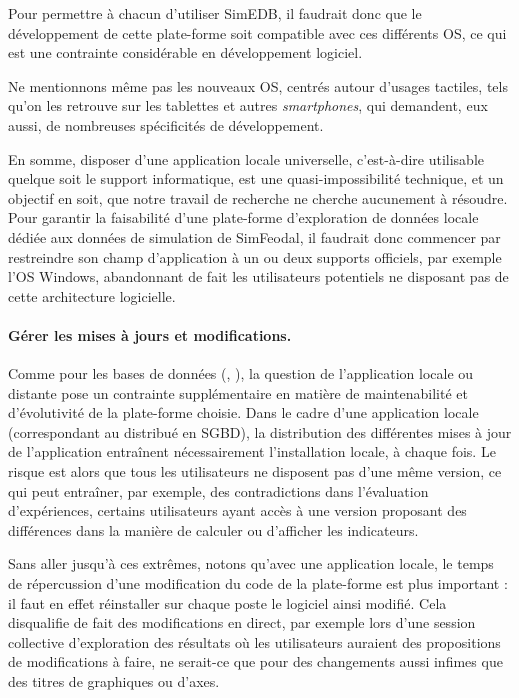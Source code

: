 Pour permettre à chacun d'utiliser SimEDB, il faudrait donc que le développement de cette plate-forme soit compatible avec ces différents OS, ce qui est une contrainte considérable en développement logiciel.

Ne mentionnons même pas les nouveaux OS, centrés autour d'usages tactiles, tels qu'on les retrouve sur les tablettes et autres \textit{smartphones}, qui demandent, eux aussi, de nombreuses spécificités de développement.

En somme, disposer d'une application locale universelle, c'est-à-dire utilisable quelque soit le support informatique, est une quasi-impossibilité technique, et un objectif en soit, que notre travail de recherche ne cherche aucunement à résoudre.
Pour garantir la faisabilité d'une plate-forme d'exploration de données locale dédiée aux données de simulation de SimFeodal, il faudrait donc commencer par restreindre son champ d'application à un ou deux supports officiels, par exemple l'OS Windows, abandonnant de fait les utilisateurs potentiels ne disposant pas de cette architecture logicielle.

\paragraph{Gérer les mises à jours et modifications.}

Comme pour les bases de données (\og {}\fg{}, ), la question de l'application locale ou distante pose un contrainte supplémentaire en matière de maintenabilité et d'évolutivité de la plate-forme choisie.
Dans le cadre d'une application locale (correspondant au distribué en SGBD), la distribution des différentes mises à jour de l'application entraînent nécessairement l'installation locale, à chaque fois.
Le risque est alors que tous les utilisateurs ne disposent pas d'une même version, ce qui peut entraîner, par exemple, des contradictions dans l'évaluation d'expériences, certains utilisateurs ayant accès à une version proposant des différences dans la manière de calculer ou d'afficher les indicateurs.

Sans aller jusqu'à ces extrêmes, notons qu'avec une application locale, le temps de répercussion d'une modification du code de la plate-forme est plus important : il faut en effet réinstaller sur chaque poste le logiciel ainsi modifié.
Cela disqualifie de fait des modifications \og en direct\fg{}, par exemple lors d'une session collective d'exploration des résultats où les utilisateurs auraient des propositions de modifications à faire, ne serait-ce que pour des changements aussi infimes que des titres de graphiques ou d'axes.

